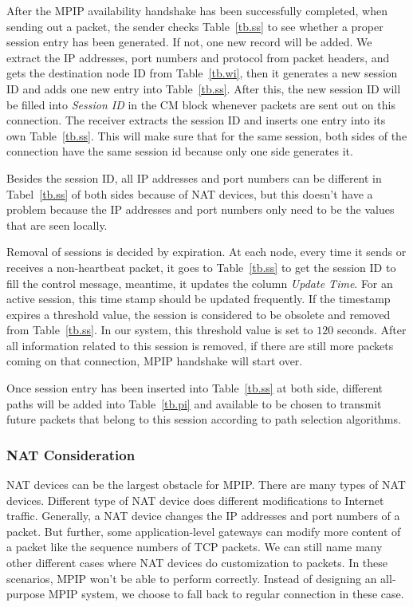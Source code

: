 After the MPIP availability handshake has been successfully completed, when sending out a packet, the sender checks Table~\ref{tb.ss} to see whether a proper session entry has been generated. If not, one new record will be added. We extract the IP addresses, port numbers and protocol from packet headers, and gets the destination node ID from Table~\ref{tb.wi}, then it generates a new session ID and adds one new entry into Table~\ref{tb.ss}. After this, the new session ID will be filled into \emph{Session ID} in the CM block whenever packets are sent out on this connection. The receiver extracts the session ID and inserts one entry into its own Table~\ref{tb.ss}. This will make sure that for the same session, both sides of the connection have the same session id because only one side generates it.

Besides the session ID, all IP addresses and port numbers can be different in Tabel~\ref{tb.ss} of both sides because of NAT devices, but this doesn't have a problem because the IP addresses and port numbers only need to be the values that are seen locally.

Removal of sessions is decided by expiration. At each node, every time it sends or receives a non-heartbeat packet, it goes to Table~\ref{tb.ss} to get the session ID to fill the control message, meantime, it updates the column \emph{Update Time}. For an active session, this time stamp should be updated frequently. If the timestamp expires a threshold value, the session is considered to be obsolete and removed from Table~\ref{tb.ss}. In our system, this threshold value is set to $120$ seconds. After all information related to this session is removed, if there are still more packets coming on that connection, MPIP handshake will start over.

Once session entry has been inserted into Table~\ref{tb.ss} at both side, different paths will be added into Table~\ref{tb.pi} and available to be chosen to transmit future packets that belong to this session according to path selection algorithms. 

\subsubsection{NAT Consideration}

NAT devices can be the largest obstacle for MPIP. There are many types of NAT devices. Different type of NAT device does different modifications to Internet traffic. Generally, a NAT device changes the IP addresses and port numbers of a packet. But further, some application-level gateways can modify more content of a packet like the sequence numbers of TCP packets. We can still name many other different cases where NAT devices do customization to packets. In these scenarios, MPIP won't be able to perform correctly. Instead of designing an all-purpose MPIP system, we choose to fall back to regular connection in these case. 

